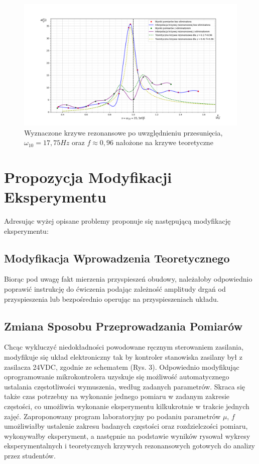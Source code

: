 \documentclass[12pt]{article}
\begin{document}
\begin{figure}[H]	
	\centering
	\includegraphics[width=\textwidth]{combination5}
	\caption{Wyznaczone krzywe rezonansowe po uwzględnieniu przesunięcia, $\omega_{10}=17,75Hz$ oraz $f\approx0,96$ nałożone na krzywe teoretyczne}
	\label{rys:comb2}
\end{figure}

\section*{Propozycja Modyfikacji Eksperymentu}
Adresując wyżej opisane problemy proponuje się następującą modyfikację eksperymentu:
\subsection*{Modyfikacja Wprowadzenia Teoretycznego}
Biorąc pod uwagę fakt mierzenia przyspieszeń obudowy, należałoby odpowiednio poprawić instrukcję do ćwiczenia podając zależność amplitudy drgań od przyspieszenia lub bezpośrednio operując na przyspieszeniach układu.
\subsection*{Zmiana Sposobu Przeprowadzania Pomiarów}
Chcąc wykluczyć niedokładności powodowane ręcznym sterowaniem zasilania, modyfikuje się układ elektroniczny tak by kontroler stanowiska zasilany był z zasilacza 24VDC, zgodnie ze schematem (Rys. 3). Odpowiednio modyfikując oprogramowanie mikrokontrolera uzyskuje się możliwość automatycznego ustalania częstotliwości wymuszenia, według zadanych parametrów. Skraca się także czas potrzebny na wykonanie jednego pomiaru w zadanym zakresie częstości, co umożliwia wykonanie eksperymentu kilkukrotnie w trakcie jednych zajęć.
Zaproponowany program laboratoryjny po podaniu parametrów $\mu$, $f$ umożliwiałby ustalenie zakresu badanych częstości oraz rozdzielczości pomiaru, wykonywałby eksperyment, a następnie na podstawie wyników rysował wykresy eksperymentalnych i teoretycznych krzywych rezonansowych gotowych do analizy przez studentów.
\end{document}
